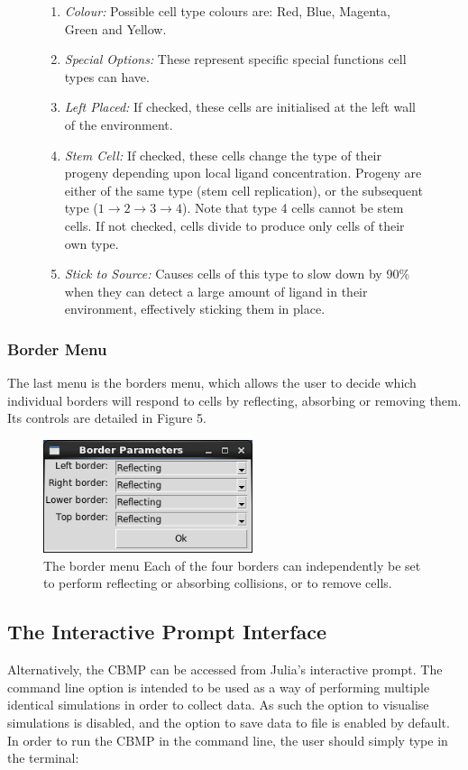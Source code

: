 \documentclass[12pt]{article}
\begin{document}
\begin{figure}[H]
{\begin{enumerate}[topsep=2pt,itemsep=-1ex,partopsep=1ex,parsep=1ex]
concentration to mean ligand concentration detected by individual cells 
receptors. If the ratio is below this value, the signal is 
deemed to be lost to noise, and the cell will not respond to it.
\item {\itshape Colour:} Possible cell type colours are: Red, Blue, Magenta, Green and 
Yellow.
\item {\itshape Special Options:} These represent specific special 
functions cell types can have.
\item {\itshape Left Placed:} If checked, these cells are initialised at the left wall of the environment.
\item {\itshape Stem Cell:} If checked, these cells change the type of their progeny depending upon local ligand 
concentration. Progeny are either of the same type (stem cell replication), or the subsequent type  
(\(1 \rightarrow 2 \rightarrow 3 \rightarrow 4\)). Note that type 4 cells cannot be stem cells. If not checked,
cells divide to produce only cells of their own type.
\item {\itshape Stick to Source:} Causes cells of this type to slow down by 90\% when they can detect
  a large amount of ligand in their environment, effectively sticking them in place.
\end{enumerate}
}
\end{figure}

\subsubsection{Border Menu}
The last menu is the borders menu, which allows the user to decide which 
individual borders will respond to cells by reflecting, absorbing or 
removing them. Its controls are detailed in Figure 5.

\begin{figure}[H]
\centering
\includegraphics[width=6.13cm]{media/border_screen.png}
\caption[]{The border menu Each of the four 
borders can independently be set to perform reflecting or absorbing 
collisions, or to remove cells.}
\end{figure}

\subsection{The Interactive Prompt Interface}
Alternatively, the CBMP can be accessed from Julia's interactive prompt. 
The command line option is intended to be used as a way of performing 
multiple identical simulations in order to collect data. As such the 
option to visualise simulations is disabled, and the option to save data 
to file is enabled by default. In order to run the CBMP in the command 
line, the user should simply type in the terminal: \\
\end{document}
